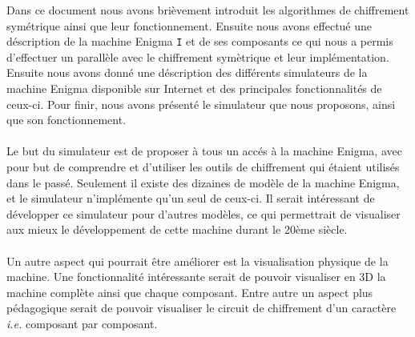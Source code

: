\documentclass[letterpaper]{article}
\begin{document}
Dans ce document nous avons brièvement introduit les algorithmes de chiffrement symétrique ainsi que leur fonctionnement. Ensuite nous avons effectué une déscription de la machine Enigma \texttt{I} et de ses composants ce qui nous a permis d'effectuer un parallèle avec le chiffrement symètrique et leur implémentation. Ensuite nous avons donné une déscription des différents simulateurs de la machine Enigma disponible sur Internet et des principales fonctionnalités de ceux-ci. Pour finir, nous avons présenté le simulateur que nous proposons, ainsi que son fonctionnement. 

\paragraph{}
Le but du simulateur est de proposer à tous un accés à la machine Enigma, avec pour but de comprendre et d'utiliser les outils de chiffrement qui étaient utilisés dans le passé. Seulement il existe des dizaines de modèle de la machine Enigma, et le simulateur n'implémente qu'un seul de ceux-ci. Il serait intéressant de développer ce simulateur pour d'autres modèles, ce qui permettrait de visualiser aux mieux le développement de cette machine durant le 20ème siècle.

\paragraph{}
Un autre aspect qui pourrait être améliorer est la visualisation physique de la machine. Une fonctionnalité intéressante serait de pouvoir visualiser en 3D la machine complète ainsi que chaque composant. Entre autre un aspect plus pédagogique serait de pouvoir visualiser le circuit de chiffrement d'un caractère \textit{i.e.} composant par composant.

\footnotesize


\end{document}
